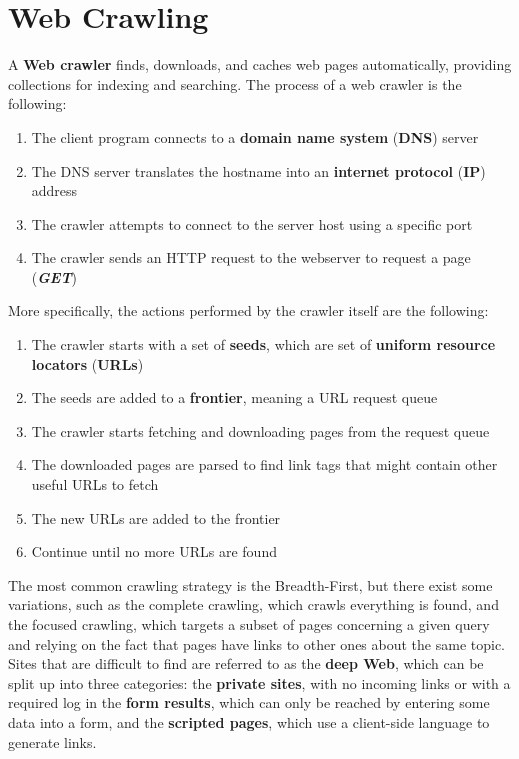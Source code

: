 \documentclass{article}
\begin{document}
\newpage

\section{Web Crawling}
A \textbf{Web crawler} finds, downloads, and caches web pages automatically, providing collections for indexing and searching. The process of a web crawler is the following:
\begin{enumerate}
    \item The client program connects to a \textbf{domain name system} (\textbf{DNS}) server
    \item The DNS server translates the hostname into an \textbf{internet protocol} (\textbf{IP}) address
    \item The crawler attempts to connect to the server host using a specific port
    \item The crawler sends an HTTP request to the webserver to request a page (\textbf{\textit{GET}})
\end{enumerate}
More specifically, the actions performed by the crawler itself are the following:
\begin{enumerate}
    \item The crawler starts with a set of \textbf{seeds}, which are set of \textbf{uniform resource locators} (\textbf{URLs})
    \item The seeds are added to a \textbf{frontier}, meaning a URL request queue
    \item The crawler starts fetching and downloading pages from the request queue
    \item The downloaded pages are parsed to find link tags that might contain other useful URLs to fetch
    \item The new URLs are added to the frontier
    \item Continue until no more URLs are found
\end{enumerate}
The most common crawling strategy is the Breadth-First, but there exist some variations, such as the complete crawling, which crawls everything is found, and the focused crawling, which targets a subset of pages concerning a given query and relying on the fact that pages have links to other ones about the same topic.
Sites that are difficult to find are referred to as the \textbf{deep Web}, which can be split up into three categories: the \textbf{private sites}, with no incoming links or with a required log in the \textbf{form results}, which can only be reached by entering some data into a form, and the \textbf{scripted pages}, which use a client-side language to generate links.
\end{document}
